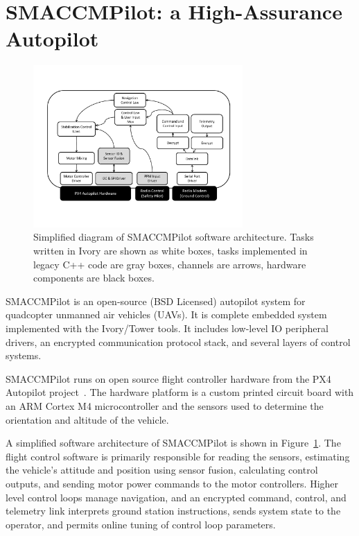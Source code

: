 \section{SMACCMPilot: a High-Assurance Autopilot}
\label{sec:smaccmpilot}

\begin{figure}[ht!]
  \begin{center}
\includegraphics[width=8cm]{figures/smaccmpilot-diagram-jan14}
  \end{center}
\caption[SMACCMPilot software architecture]{
Simplified diagram of SMACCMPilot
software architecture. Tasks written in Ivory are shown as white boxes,
tasks implemented in legacy C++ code are gray boxes,
channels are arrows,
hardware components are black boxes.}
\label{fig:smaccmpilotSwArch}
\end{figure}

SMACCMPilot is an open-source (BSD Licensed) autopilot system for quadcopter
unmanned air vehicles (UAVs).
It is complete embedded system implemented with
the Ivory/Tower tools.
It includes low-level IO peripheral drivers, an encrypted
communication protocol stack, and several layers of control systems.

SMACCMPilot runs on open source flight controller hardware from the PX4
Autopilot project~\cite{px4-proj}. The hardware platform is a custom printed
circuit board with an ARM Cortex M4 microcontroller and the sensors used to
determine the orientation and altitude of the vehicle.


A simplified software architecture of SMACCMPilot is shown in
Figure~\ref{fig:smaccmpilotSwArch}.
The flight control software is primarily responsible for reading the sensors,
estimating the vehicle's attitude and position using sensor fusion, calculating
control outputs, and sending motor power commands to the motor controllers.
Higher level control loops manage navigation, and an encrypted command, control,
and telemetry link interprets ground station instructions, sends system state to
the operator, and permits online tuning of control loop parameters.

